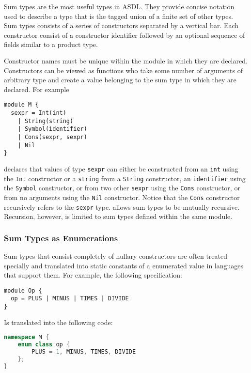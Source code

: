 Sum types are the most useful types in ASDL. They provide concise notation
used to describe a type that is the tagged union of a finite set of other
types.  Sum types consists of a series of constructors separated by a
vertical bar. Each constructor consist of a constructor identifier followed
by an optional sequence of fields similar to a product type. 

Constructor names must be unique within the module in which they are
declared. Constructors can be viewed as functions who take some number of
arguments of arbitrary type and create a value belonging to the sum type in
which they are declared.
For example
\begin{code}\begin{lstlisting}[language=ASDL]
module M {
  sexpr = Int(int)
	| String(string)
	| Symbol(identifier)
	| Cons(sexpr, sexpr)
	| Nil
}
\end{lstlisting}\end{code}%
declares that values of type \lstinline[language=ASDL]!sexpr! can either be
constructed from an \lstinline[language=ASDL]!int! using the
\lstinline[language=ASDL]!Int! constructor or a \lstinline[language=ASDL]!string!
from a \lstinline[language=ASDL]!String! constructor, an
\lstinline[language=ASDL]!identifier! using the \lstinline[language=ASDL]!Symbol!
constructor, or from two other \lstinline[language=ASDL]!sexpr! using the
\lstinline[language=ASDL]!Cons! constructor, or from no arguments
using the \lstinline[language=ASDL]!Nil! constructor.
Notice that the \lstinline[language=ASDL]!Cons! constructor
recursively refers to the \lstinline[language=ASDL]!sexpr! type.
\asdl{} allows sum types to be mutually recursive.
Recursion, however, is limited to sum types defined within the same module.

\subsubsection{Sum Types as Enumerations}
\label{sec:enumerations}

Sum types that consist completely of nullary constructors
are often treated specially and translated into static constants of a
enumerated value in languages that support them.
For example, the following \asdl{} specification:
%
\begin{code}\begin{lstlisting}[language=ASDL]
module Op {
  op = PLUS | MINUS | TIMES | DIVIDE 
}
\end{lstlisting}\end{code}%
%
Is translated into the following \Cplusplus{} code:
%
\begin{code}\begin{lstlisting}[language=c++]
namespace M {
    enum class op {
        PLUS = 1, MINUS, TIMES, DIVIDE
    };
}
\end{lstlisting}\end{code}%

